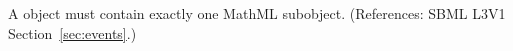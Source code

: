 A \Trigger object must contain exactly one MathML 
subobject. (References: SBML L3V1 Section~\ref{sec:events}.)
